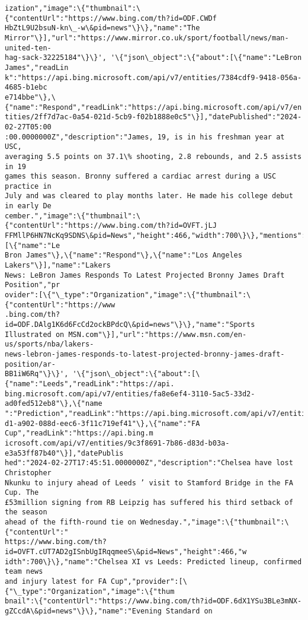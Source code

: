 \documentclass[11pt]{article}
\begin{document}
\begin{Verbatim}[commandchars=\\\{\}]
ization","image":\{"thumbnail":\{"contentUrl":"https://www.bing.com/th?id=ODF.CWDf
HbZtL9U2bsuN-kn\_-w\&pid=news"\}\},"name":"The
Mirror"\}],"url":"https://www.mirror.co.uk/sport/football/news/man-united-ten-
hag-sack-32225184"\}\}', '\{"json\_object":\{"about":[\{"name":"LeBron James","readLin
k":"https://api.bing.microsoft.com/api/v7/entities/7384cdf9-9418-056a-4685-b1ebc
e714bbe"\},\{"name":"Respond","readLink":"https://api.bing.microsoft.com/api/v7/en
tities/2ff7d7ac-0a54-021d-5cb9-f02b1888e0c5"\}],"datePublished":"2024-02-27T05:00
:00.0000000Z","description":"James, 19, is in his freshman year at USC,
averaging 5.5 points on 37.1\% shooting, 2.8 rebounds, and 2.5 assists in 19
games this season. Bronny suffered a cardiac arrest during a USC practice in
July and was cleared to play months later. He made his college debut in early De
cember.","image":\{"thumbnail":\{"contentUrl":"https://www.bing.com/th?id=OVFT.jLJ
FFMllP6HN7NcKq9SDNS\&pid=News","height":466,"width":700\}\},"mentions":[\{"name":"Le
Bron James"\},\{"name":"Respond"\},\{"name":"Los Angeles Lakers"\}],"name":"Lakers
News: LeBron James Responds To Latest Projected Bronny James Draft Position","pr
ovider":[\{"\_type":"Organization","image":\{"thumbnail":\{"contentUrl":"https://www
.bing.com/th?id=ODF.DAlg1K6d6FcCd2ockBPdcQ\&pid=news"\}\},"name":"Sports
Illustrated on MSN.com"\}],"url":"https://www.msn.com/en-us/sports/nba/lakers-
news-lebron-james-responds-to-latest-projected-bronny-james-draft-position/ar-
BB1iW6Rq"\}\}', '\{"json\_object":\{"about":[\{"name":"Leeds","readLink":"https://api.
bing.microsoft.com/api/v7/entities/fa8e6ef4-3110-5ac5-33d2-ad0fed512eb8"\},\{"name
":"Prediction","readLink":"https://api.bing.microsoft.com/api/v7/entities/e83984
d1-a902-088d-eec6-3f11c719ef41"\},\{"name":"FA Cup","readLink":"https://api.bing.m
icrosoft.com/api/v7/entities/9c3f8691-7b86-d83d-b03a-e3a53ff87b40"\}],"datePublis
hed":"2024-02-27T17:45:51.0000000Z","description":"Chelsea have lost Christopher
Nkunku to injury ahead of Leeds ’ visit to Stamford Bridge in the FA Cup. The
£53million signing from RB Leipzig has suffered his third setback of the season
ahead of the fifth-round tie on Wednesday.","image":\{"thumbnail":\{"contentUrl":"
https://www.bing.com/th?id=OVFT.cUT7AD2gISnbUgIRqqmeeS\&pid=News","height":466,"w
idth":700\}\},"name":"Chelsea XI vs Leeds: Predicted lineup, confirmed team news
and injury latest for FA Cup","provider":[\{"\_type":"Organization","image":\{"thum
bnail":\{"contentUrl":"https://www.bing.com/th?id=ODF.6dX1YSu3BLe3mNX-
gZCcdA\&pid=news"\}\},"name":"Evening Standard on

\end{Verbatim}
\end{document}
